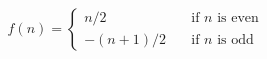 \[ f(n) =
\begin{cases}
  n/2       & \quad \text{if } n \text{ is even}\\
  -(n+1)/2  & \quad \text{if } n \text{ is odd}
\end{cases}
\]